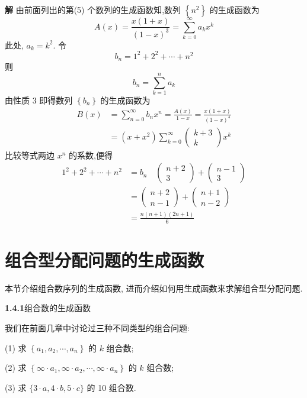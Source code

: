 \documentclass{report}
\begin{document}
\textbf{解  }由前面列出的第(5) 个数列的生成函数知,数列 $\left\{n^{2}\right\}$ 的生成函数为
$$
A(x)=\frac{x(1+x)}{(1-x)^{3}}=\sum_{k=0}^{\infty} a_{k} x^{k}
$$
此处, $a_{k}=k^{2}$. 令
$$
b_{n}=1^{2}+2^{2}+\cdots+n^{2}
$$
则
$$
b_{n}=\sum_{k=1}^{n} a_{k}
$$
由性质 3 即得数列 $\left\{b_{n}\right\}$ 的生成函数为
$$
\begin{aligned}
B(x) &=\sum_{n=0}^{\infty} b_{n} x^{n}=\frac{A(x)}{1-x}=\frac{x(1+x)}{(1-x)^{4}} \\
&=\left(x+x^{2}\right) \sum_{k=0}^{\infty}\left(\begin{array}{c}
k+3 \\ k
\end{array}\right) x^{k}
\end{aligned}
$$
比较等式两边 $x^{n}$ 的系数,便得
$$
\begin{aligned}
1^{2}+2^{2}+\cdots+n^{2} &=b_{n} \quad\left(\begin{array}{c}
n+2 \\ 3
\end{array}\right)+\left(\begin{array}{c}
n-1 \\ 3
\end{array}\right) \\
&=\left(\begin{array}{l}
n+2 \\ n-1
\end{array}\right)+\left(\begin{array}{l}
n+1 \\ n-2
\end{array}\right) \\
&=\frac{n(n+1)(2 n+1)}{6}
\end{aligned}
$$

\section{组合型分配问题的生成函数}
本节介绍组合数序列的生成函数, 进而介绍如何用生成函数来求解组合型分配问题.

\textbf{1.4.1}组合数的生成函数

我们在前面几章中讨论过三种不同类型的组合问题:


(1) 求 $\left\{a_{1}, a_{2}, \cdots, a_{n}\right\}$ 的 $k$ 组合数;

(2) 求 $\left\{\infty \cdot a_{1}, \infty \cdot a_{2}, \cdots, \infty \cdot a_{n}\right\}$ 的 $k$ 组合数;

(3) 求 $\{3 \cdot a, 4 \cdot b, 5 \cdot c\}$ 的 10 组合数.
\end{document}
